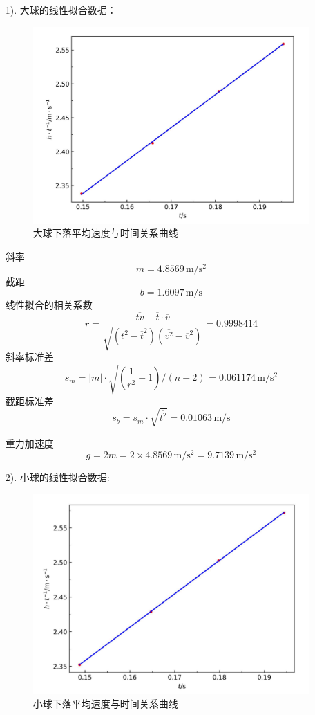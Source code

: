 \documentclass[UTF8]{ctexart}
\begin{document}
\begin{enumerate}
    \item [1).]大球的线性拟合数据：
    \begin{figure}[h]
        \centering
        \includegraphics[scale=0.5]{big.png}
        \caption{大球下落平均速度与时间关系曲线}
    \end{figure}
    
    \noindent 斜率
    $$
    m=4.8569\,\mathrm{m/s^2}
    $$
    截距
    $$
    b=1.6097\,\mathrm{m/s}
    $$
    线性拟合的相关系数
    $$
    r=\frac{\overline{tv}-\overline{t}\cdot\overline{v}}{\sqrt{\left(\overline{t^2}-\overline{t}^2\right)\left(\overline{v^2}-\overline{v}^2\right)}}=0.9998414
    $$
    斜率标准差
    $$
    s_m=\lvert m\rvert\cdot\sqrt{\left(\frac{1}{r^2}-1\right)/(n-2)}=0.061174\,\mathrm{m/s^2}
    $$
    截距标准差
    $$
    s_b=s_m\cdot\sqrt{\overline{t^2}}=0.01063\,\mathrm{m/s}
    $$
    
    \noindent 重力加速度
    $$
    g=2 m=2\times 4.8569\,\mathrm{m/s^2}=9.7139\,\mathrm{m/s^2}
    $$
    \item [2).]小球的线性拟合数据:
    \begin{figure}[h]
        \centering
        \includegraphics[scale=0.5]{small.png}
        \caption{小球下落平均速度与时间关系曲线}
    \end{figure}
    

\end{enumerate}
\end{document}
